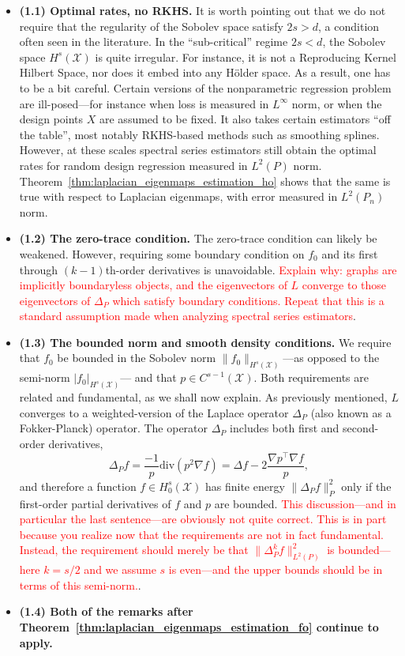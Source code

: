 \documentclass{article}
\newcommand{\1}{\mathbf{1}}
\newcommand{\Leb}{L}
\newcommand{\mc}[1]{\mathcal{#1}}
\theoremstyle{alden}
\theoremstyle{aldenthm}
\theoremstyle{definition}
\theoremstyle{remark}
\begin{document}
\begin{itemize}
	\item \textbf{(1.1) Optimal rates, no RKHS.} It is worth pointing out that we do not require that the regularity of the Sobolev space satisfy $2s > d$, a condition often seen in the literature. In the ``sub-critical'' regime $2s < d$, the Sobolev space $H^s(\mc{X})$ is quite irregular. For instance, it is not a Reproducing Kernel Hilbert Space, nor does it embed into any H\"{o}lder space. As a result, one has to be a bit careful. Certain versions of the nonparametric regression problem are ill-posed---for instance when loss is measured in $\Leb^{\infty}$ norm, or when the design points $X$ are assumed to be fixed. It also takes certain estimators ``off the table'', most notably RKHS-based methods such as smoothing splines. However, at these scales spectral series estimators still obtain the optimal rates for random design regression measured in $\Leb^2(P)$ norm. Theorem~\ref{thm:laplacian_eigenmaps_estimation_ho} shows that the same is true with respect to Laplacian eigenmaps, with error measured in $\Leb^2(P_n)$ norm.
	\item \textbf{(1.2) The zero-trace condition.} The zero-trace condition can likely be weakened. However, requiring some boundary condition on $f_0$ and its first through $(k -1 )$th-order derivatives is unavoidable. \textcolor{red}{Explain why: graphs are implicitly boundaryless objects, and the eigenvectors of $L$ converge to those eigenvectors of $\Delta_P$ which satisfy boundary conditions. Repeat that this is a standard assumption made when analyzing spectral series estimators}.
	\item \textbf{(1.3) The bounded norm and smooth density conditions.} We require that $f_0$ be bounded in the Sobolev norm $\|f_0\|_{H^s(\mc{X})}$---as opposed to the semi-norm $|f_0|_{H^s(\mc{X})}$--- and that $p \in C^{s - 1}(\mc{X})$. Both requirements are related and fundamental, as we shall now explain. As previously mentioned, $L$ converges to a weighted-version of the Laplace operator $\Delta_P$ (also known as a Fokker-Planck) operator. The operator $\Delta_P$ includes both first and second-order derivatives,
	\begin{equation}
	\label{eqn:fokker_planck_1}
	\Delta_Pf= \frac{-1}{p} \mathrm{div}(p^2 \nabla f) = \Delta f - 2\frac{\nabla p^{\top} \nabla f}{p},
	\end{equation}
	and therefore a function $f \in H_0^s(\mc{X})$ has finite energy $\|\Delta_P f\|_{P}^2$ only if the first-order partial derivatives of $f$ and $p$ are bounded. \textcolor{red}{This discussion---and in particular the last sentence---are obviously not quite correct. This is in part because you realize now that the requirements are not in fact fundamental. Instead, the requirement should merely be that $\|\Delta_P^kf\|_{\Leb^2(P)}^2$ is bounded---here $k = s/2$ and we assume $s$ is even---and the upper bounds should be in terms of this semi-norm.}.
	\item \textbf{(1.4) Both of the remarks after Theorem~\ref{thm:laplacian_eigenmaps_estimation_fo} continue to apply.}
\end{itemize}
\end{document}
